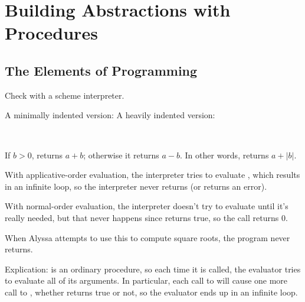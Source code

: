 \chapter{Building Abstractions with Procedures}

\section{The Elements of Programming}

\begin{exe} %
    Check with a scheme interpreter.
\end{exe}

\begin{exe} %
    A minimally indented version:
    A heavily indented version:
\end{exe}

\begin{exe} %
    \ \vspace{-20pt}
\end{exe}

\begin{exe} %
    If $b > 0$,  returns $a + b$; otherwise it returns 
    $a - b$. In other words,  returns $a + |b|$.
\end{exe}

\begin{exe} %
    With applicative-order evaluation, the interpreter tries to evaluate 
    , which results in an infinite loop, so the interpreter never 
    returns (or returns an error).

    With normal-order evaluation, the interpreter doesn't try to evaluate 
     until it's really needed, but that never happens since
     returns true, so the call returns 0.
\end{exe}

\begin{exe} %
    When Alyssa attempts to use this to compute square roots, the program never 
    returns.

    Explication:  is an ordinary procedure, so each time it is 
    called, the evaluator tries to evaluate all of its arguments. In particular, 
    each call to  will cause one more call to , 
    whether  returns true or not, so the evaluator 
    ends up in an infinite loop.
\end{exe}

